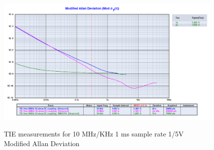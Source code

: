 \documentclass[11pt,english,a4paper]{article}
\begin{document}
\begin{figure}[!htb]
  \caption{TIE measurements for 10 MHz/KHz 1 ms sample rate 1/5V Modified Allan Deviation}
  \centering
    \includegraphics[width=1\textwidth]{mod_allan_last_part3.png}
    \label{fig:sg_10x_mod_allan_dev}
\end{figure}
\end{document}
